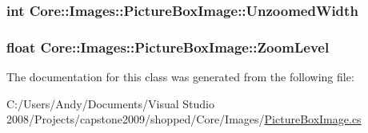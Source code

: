 \label{class_core_1_1_images_1_1_picture_box_image_a3078df347f79d1d2e10da136fede49d1}
\hypertarget{class_core_1_1_images_1_1_picture_box_image_a524c25040b60765a23b4755056c4960f}{
\subsubsection[{UnzoomedWidth}]{\setlength{\rightskip}{0pt plus 5cm}int Core::Images::PictureBoxImage::UnzoomedWidth}}
\label{class_core_1_1_images_1_1_picture_box_image_a524c25040b60765a23b4755056c4960f}
\hypertarget{class_core_1_1_images_1_1_picture_box_image_a0394f492d438a5ce37f9aafa6a2c8a5b}{
\subsubsection[{ZoomLevel}]{\setlength{\rightskip}{0pt plus 5cm}float Core::Images::PictureBoxImage::ZoomLevel}}
\label{class_core_1_1_images_1_1_picture_box_image_a0394f492d438a5ce37f9aafa6a2c8a5b}


The documentation for this class was generated from the following file:\begin{DoxyCompactItemize}
\item 
C:/Users/Andy/Documents/Visual Studio 2008/Projects/capstone2009/shopped/Core/Images/\hyperlink{_picture_box_image_8cs}{PictureBoxImage.cs}\end{DoxyCompactItemize}
